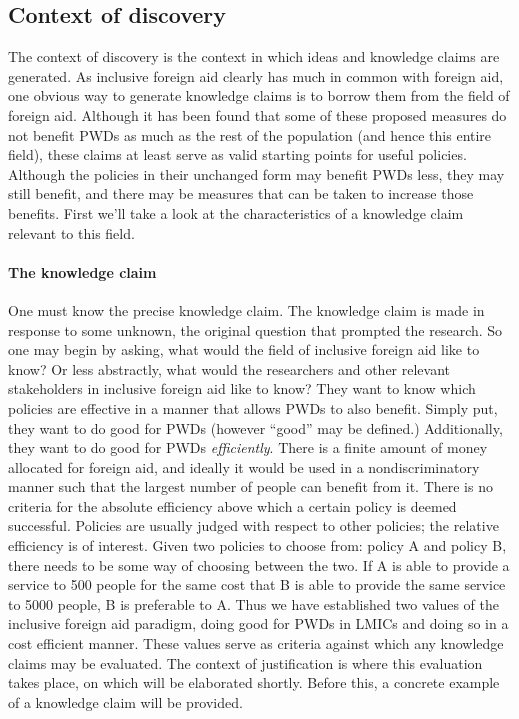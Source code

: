 \documentclass[a4paper]{article}
\begin{document}
\subsection{Context of discovery}

The context of discovery is the context in which ideas and knowledge claims
are generated. As inclusive foreign aid clearly has much in common with
foreign aid, one obvious way to generate knowledge claims is to borrow them
from the field of foreign aid. Although it has been found that some of these
proposed measures do not benefit PWDs as much as the rest of the population
(and hence this entire field), these claims at least serve as valid starting
points for useful policies. Although the policies in their unchanged form may
benefit PWDs less, they may still benefit, and there may be measures that can
be taken to increase those benefits. First we'll take a look at the
characteristics of a knowledge claim relevant to this field.


\paragraph{The knowledge claim}

One must know the precise knowledge claim. The knowledge claim is made in
response to some unknown, the original question that prompted the research. So
one may begin by asking, what would the field of inclusive foreign aid like to
know? Or less abstractly, what would the researchers and other relevant
stakeholders in inclusive foreign aid like to know? They want to know which
policies are effective in a manner that allows PWDs to also benefit. Simply
put, they want to do good for PWDs (however ``good'' may be defined.)
Additionally, they want to do good for PWDs \emph{efficiently}. There is a
finite amount of money allocated for foreign aid, and ideally it would be used
in a nondiscriminatory manner such that the largest number of people can
benefit from it. There is no criteria for the absolute efficiency above which
a certain policy is deemed successful. Policies are usually judged with
respect to other policies; the relative efficiency is of interest. Given two
policies to choose from: policy A and policy B, there needs to be some way of
choosing between the two. If A is able to provide a service to 500 people for
the same cost that B is able to provide the same service to 5000 people, B is
preferable to A. Thus we have established two values of the inclusive foreign
aid paradigm, doing good for PWDs in LMICs and doing so in a cost efficient
manner. These values serve as criteria against which any knowledge claims may
be evaluated. The context of justification is where this evaluation takes
place, on which will be elaborated shortly. Before this, a concrete example of
a knowledge claim will be provided.
\end{document}
